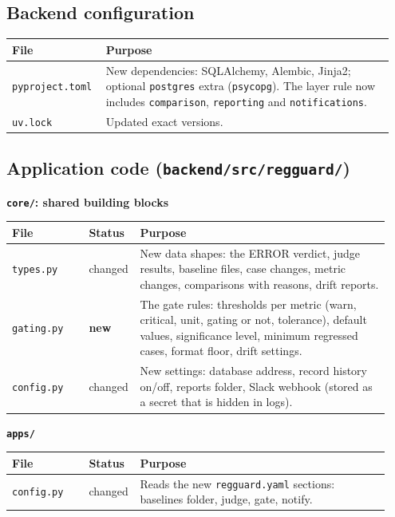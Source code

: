 \documentclass[11pt,a4paper]{article}
\newcommand{\code}[1]{\nolinkurl{#1}}
\newcommand{\new}{\textbf{new}}
\begin{document}
\subsection{Backend configuration}

\begin{longtable}{@{}p{0.22\linewidth}p{0.73\linewidth}@{}}
\toprule
\textbf{File} & \textbf{Purpose} \\
\midrule
\endhead
\code{pyproject.toml} & New dependencies: SQLAlchemy, Alembic, Jinja2; optional \code{postgres} extra (\code{psycopg}). The layer rule now includes \code{comparison}, \code{reporting} and \code{notifications}. \\
\code{uv.lock} & Updated exact versions. \\
\bottomrule
\end{longtable}

\subsection{Application code (\texorpdfstring{\code{backend/src/regguard/}}{backend/src/regguard/})}

\textbf{\code{core/}: shared building blocks}

\begin{longtable}{@{}p{0.20\linewidth}p{0.09\linewidth}p{0.65\linewidth}@{}}
\toprule
\textbf{File} & \textbf{Status} & \textbf{Purpose} \\
\midrule
\endhead
\code{types.py} & changed & New data shapes: the ERROR verdict, judge results, baseline files, case changes, metric changes, comparisons with reasons, drift reports. \\
\code{gating.py} & \new & The gate rules: thresholds per metric (warn, critical, unit, gating or not, tolerance), default values, significance level, minimum regressed cases, format floor, drift settings. \\
\code{config.py} & changed & New settings: database address, record history on/off, reports folder, Slack webhook (stored as a secret that is hidden in logs). \\
\bottomrule
\end{longtable}

\textbf{\code{apps/}}

\begin{longtable}{@{}p{0.20\linewidth}p{0.09\linewidth}p{0.65\linewidth}@{}}
\toprule
\textbf{File} & \textbf{Status} & \textbf{Purpose} \\
\midrule
\endhead
\code{config.py} & changed & Reads the new \code{regguard.yaml} sections: baselines folder, judge, gate, notify. \\
\bottomrule
\end{longtable}
\end{document}
